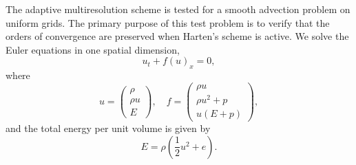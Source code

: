 \documentclass[]{article}
\begin{document}
        The adaptive multiresolution scheme is tested for a smooth advection
        problem on uniform grids. The primary purpose of this test problem is
        to verify that the orders of convergence are preserved when Harten's
        scheme is active. We solve the Euler equations in one spatial dimension,
        \begin{equation}
           u_{t} + f(u)_{x} = 0,
        \label{euler1d}
        \end{equation}
        where
        \begin{equation}
            u =
            \begin{pmatrix}
                \rho \\ \rho u \\ E
            \end{pmatrix}, \quad
            f =
            \begin{pmatrix}
                \rho u \\ \rho u^2 + p \\ u( E + p )
            \end{pmatrix},
        \end{equation}
        and the total energy per unit volume is given by
        \begin{equation*}
            E = \rho \left( \frac{1}{2} u^2 + e \right).
        \end{equation*}
%
\end{document}
